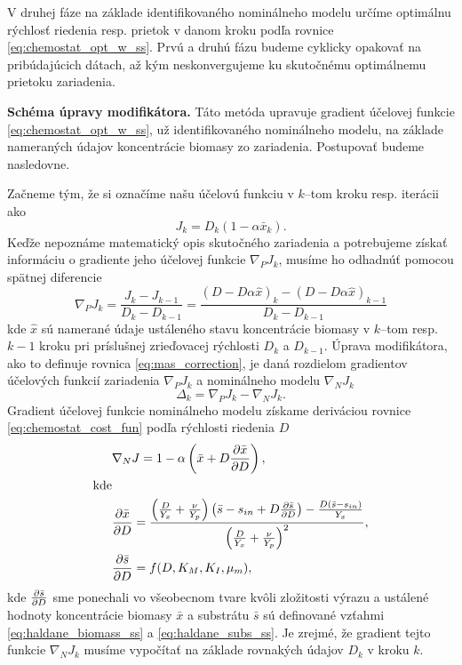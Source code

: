 V druhej fáze na základe identifikovaného nominálneho modelu určíme optimálnu rýchlosť riedenia resp. prietok v danom kroku podľa rovnice \eqref{eq:chemostat_opt_w_ss}. Prvú a druhú fázu budeme cyklicky opakovať na pribúdajúcich dátach, až kým neskonvergujeme ku skutočnému optimálnemu prietoku zariadenia.

\textbf{Schéma úpravy modifikátora.}
Táto metóda upravuje gradient účelovej funkcie \eqref{eq:chemostat_opt_w_ss}, už identifikovaného nominálneho modelu, na základe nameraných údajov koncentrácie biomasy zo zariadenia. Postupovať budeme nasledovne.

Začneme tým, že si označíme našu účelovú funkciu v $ k $--tom kroku resp. iterácii ako
\begin{equation}
\label{eq:chemostat_cost_fun}
	J_{k} = D_{k}\left(1-\alpha\bar{x}_{k}\right).
\end{equation}
Keďže nepoznáme matematický opis skutočného zariadenia a potrebujeme získať informáciu o gradiente jeho účelovej funkcie $ \nabla_{P}J_{k} $, musíme ho odhadnúť pomocou spätnej diferencie
\begin{equation}
	\nabla_{P}J_{k} = \frac{J_{k} - J_{k-1}}{D_{k} - D_{k-1}} =
	\frac{\left(D-D\alpha\hat{x}\right)_{k} - \left(D-D\alpha\hat{x}\right)_{k-1}}{D_{k} - D_{k-1}}
\end{equation}
kde $ \hat{x} $ sú namerané údaje ustáleného stavu koncentrácie biomasy v $ k $--tom resp. $ k-1 $ kroku pri príslušnej zrieďovacej rýchlosti $ D_{k} $ a $ D_{k-1} $. Úprava modifikátora, ako to definuje rovnica \eqref{eq:mas_correction}, je daná rozdielom gradientov účelových funkcií zariadenia $ \nabla_{P}J_{k} $ a nominálneho modelu $ \nabla_{N}J_{k} $ 
\begin{equation}
\label{eq:mas_chemostat_modifierValue}
	\Delta_k = \nabla_{P}J_{k} - \nabla_{N}J_{k}.
\end{equation}
Gradient účelovej funkcie nominálneho modelu získame deriváciou rovnice \eqref{eq:chemostat_cost_fun} podľa rýchlosti riedenia $ D $
\begin{align}
	&\nabla_{N}J = 1 - \alpha\left(\bar{x}+D\frac{\partial \bar{x}}{\partial D}\right),\\
	\text{kde} & \notag\\
	&\frac{\partial \bar{x}}{\partial D} = \frac{\left(\frac{D}{Y_{x}} + \frac{\nu}{Y_{p}}\right)\left(\bar{s}-s_{in}+D\frac{\partial \bar{s}}{\partial D}\right) - \frac{D\left(\bar{s}-s_{in}\right)}{Y_{x}}}{\left(\frac{D}{Y_{x}} + \frac{\nu}{Y_{p}}\right)^2},	\\
	&\frac{\partial \bar{s}}{\partial D} = f(D,K_{M},K_{I},\mu_{m}),
\end{align}
kde $ \frac{\partial \bar{s}}{\partial D} $ sme ponechali vo všeobecnom tvare kvôli zložitosti výrazu a ustálené hodnoty koncentrácie biomasy $ \bar{x} $ a substrátu $ \bar{s} $ sú definované vzťahmi \eqref{eq:haldane_biomass_ss} a \eqref{eq:haldane_subs_ss}. Je zrejmé, že gradient tejto funkcie $ \nabla_{N}J_{k} $ musíme vypočítať na základe rovnakých údajov $ D_k $ v kroku $ k $. 

